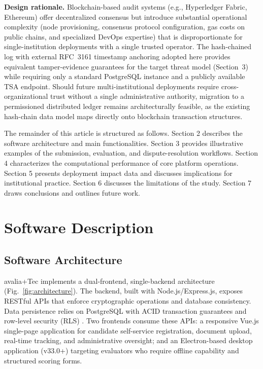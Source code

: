 \documentclass[preprint,12pt,a4paper]{elsarticle}
\begin{document}
\textbf{Design rationale.} Blockchain-based audit systems (e.g., Hyperledger Fabric, Ethereum) offer decentralized consensus but introduce substantial operational complexity (node provisioning, consensus protocol configuration, gas costs on public chains, and specialized DevOps expertise) that is disproportionate for single-institution deployments with a single trusted operator. The hash-chained log with external RFC~3161 timestamp anchoring adopted here provides equivalent tamper-evidence guarantees for the target threat model (Section~3) while requiring only a standard PostgreSQL instance and a publicly available TSA endpoint. Should future multi-institutional deployments require cross-organizational trust without a single administrative authority, migration to a permissioned distributed ledger remains architecturally feasible, as the existing hash-chain data model maps directly onto blockchain transaction structures.

The remainder of this article is structured as follows. Section 2 describes the software architecture and main functionalities. Section 3 provides illustrative examples of the submission, evaluation, and dispute-resolution workflows. Section 4 characterizes the computational performance of core platform operations. Section 5 presents deployment impact data and discusses implications for institutional practice. Section 6 discusses the limitations of the study. Section 7 draws conclusions and outlines future work.

\section{Software Description}

\subsection{Software Architecture}

avalia+Tec implements a dual-frontend, single-backend architecture (Fig.~\ref{fig:architecture}). The backend, built with Node.js/Express.js, exposes RESTful APIs that enforce cryptographic operations and database consistency. Data persistence relies on PostgreSQL with ACID transaction guarantees and row-level security (RLS) \citep{ISO27001}. Two frontends consume these APIs: a responsive Vue.js single-page application for candidate self-service registration, document upload, real-time tracking, and administrative oversight; and an Electron-based desktop application (v33.0+) targeting evaluators who require offline capability and structured scoring forms.
\end{document}
